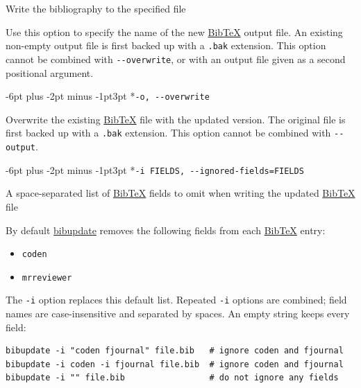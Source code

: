 \documentclass{amsart}
\makeatletter
\providecommand{\tightlist}{\setlength{\itemsep}{0pt}\setlength{\parskip}{0pt}}
\newcommand{\BibUpdateOptionHeading}{\@startsection{paragraph}{4}{0pt}
  {-6pt plus -2pt minus -1pt}{3pt}
  {\normalfont\bfseries\color{NavyBlue}}}
\newenvironment{BibUpdateOptionDescription}
  {\begin{list}{}{\setlength{\leftmargin}{2em}\setlength{\rightmargin}{0pt}%
    \setlength{\listparindent}{0pt}%
    \setlength{\topsep}{0pt}\setlength{\parsep}{4pt plus 1pt}%
    \setlength{\itemsep}{0pt}}\item\relax}
  {\end{list}}
\makeatother
\begin{document}
\begin{BibUpdateOptionDescription}

Write the bibliography to the specified file

Use this option to specify the name of the new
\href{http://www.bibtex.org/}{BibTeX} output file. An existing non-empty
output file is first backed up with a \texttt{.bak} extension. This
option cannot be combined with \texttt{-\/-overwrite}, or with an output
file given as a second positional argument.

\end{BibUpdateOptionDescription}

\BibUpdateOptionHeading*{\texorpdfstring{\texttt{-o,\ -\/-overwrite}}{-o, -\/-overwrite}}\label{-o---overwrite}

\begin{BibUpdateOptionDescription}

Overwrite the existing \href{http://www.bibtex.org/}{BibTeX} file with
the updated version. The original file is first backed up with a
\texttt{.bak} extension. This option cannot be combined with
\texttt{-\/-output}.

\end{BibUpdateOptionDescription}

\BibUpdateOptionHeading*{\texorpdfstring{\texttt{-i\ FIELDS,\ -\/-ignored-fields=FIELDS}}{-i FIELDS, -\/-ignored-fields=FIELDS}}\label{-i-fields---ignored-fieldsfields}

\begin{BibUpdateOptionDescription}

A space-separated list of \href{http://www.bibtex.org/}{BibTeX} fields
to omit when writing the updated \href{http://www.bibtex.org/}{BibTeX}
file

By default \href{https://github.com/AndrewMathas/BibUpdate}{bibupdate}
removes the following fields from each
\href{http://www.bibtex.org/}{BibTeX} entry:

\begin{itemize}
\tightlist
\item
  \texttt{coden}
\item
  \texttt{mrreviewer}
\end{itemize}

The \texttt{-i} option replaces this default list. Repeated \texttt{-i}
options are combined; field names are case-insensitive and separated by
spaces. An empty string keeps every field:

\begin{Verbatim}[breaklines=true,fontsize=\small]
bibupdate -i "coden fjournal" file.bib   # ignore coden and fjournal
bibupdate -i coden -i fjournal file.bib  # ignore coden and fjournal
bibupdate -i "" file.bib                 # do not ignore any fields
\end{Verbatim}

\end{BibUpdateOptionDescription}
\end{document}
